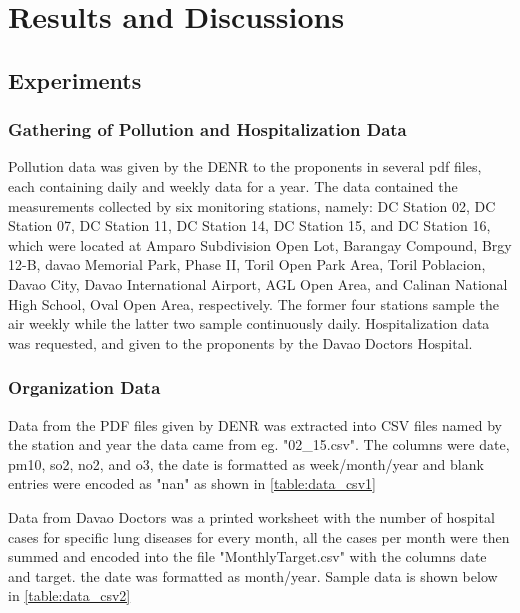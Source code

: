 \documentclass[10pt,11pt,12pt,oneside]{book}
\begin{document}
\chapter{Results and Discussions}
\section{Experiments}
\subsection{Gathering of Pollution and Hospitalization Data}
Pollution data was given by the DENR to the proponents in several pdf files, each containing daily and weekly data for a year. The data contained the measurements collected by six monitoring stations, namely: DC Station 02, DC Station 07, DC Station 11, DC Station 14, DC Station 15, and DC Station 16, which were located at Amparo Subdivision Open Lot, Barangay Compound, Brgy 12-B, davao Memorial Park, Phase II, Toril Open Park Area, Toril Poblacion, Davao City, Davao International Airport, AGL Open
Area, and Calinan National High School, Oval Open Area, respectively. The former four stations sample the air weekly while the latter two sample continuously daily. Hospitalization data was requested, and given to the proponents by the Davao Doctors Hospital.
\subsection{Organization Data}
Data from the PDF files given by DENR was extracted into CSV files named by the station and year the data came from eg. "02\_15.csv". The columns were date, pm10, so2, no2, and o3, the date is formatted as week/month/year and blank entries were encoded as "nan" as shown in \ref{table:data_csv1}

Data from Davao Doctors was a printed worksheet with the number of hospital cases for specific lung diseases for every month, all the cases per month were then summed and encoded into the file "MonthlyTarget.csv" with the columns date and target. the date was formatted as month/year. Sample data is shown below in \ref{table:data_csv2}
\end{document}
